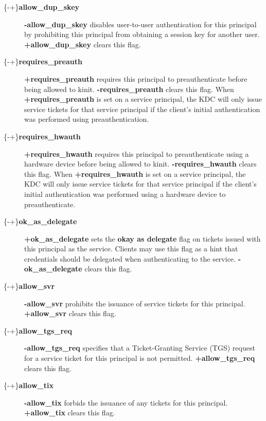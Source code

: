 \documentclass[letterpaper,10pt,english]{sphinxmanual}
\begin{document}
\begin{description}
\item[{\{-\textbar{}+\}\textbf{allow\_dup\_skey}}] \leavevmode
\textbf{-allow\_dup\_skey} disables user-to-user authentication for this
principal by prohibiting this principal from obtaining a session
key for another user.  \textbf{+allow\_dup\_skey} clears this flag.

\item[{\{-\textbar{}+\}\textbf{requires\_preauth}}] \leavevmode
\textbf{+requires\_preauth} requires this principal to preauthenticate
before being allowed to kinit.  \textbf{-requires\_preauth} clears this
flag.  When \textbf{+requires\_preauth} is set on a service principal,
the KDC will only issue service tickets for that service principal
if the client's initial authentication was performed using
preauthentication.

\item[{\{-\textbar{}+\}\textbf{requires\_hwauth}}] \leavevmode
\textbf{+requires\_hwauth} requires this principal to preauthenticate
using a hardware device before being allowed to kinit.
\textbf{-requires\_hwauth} clears this flag.  When \textbf{+requires\_hwauth} is
set on a service principal, the KDC will only issue service tickets
for that service principal if the client's initial authentication was
performed using a hardware device to preauthenticate.

\item[{\{-\textbar{}+\}\textbf{ok\_as\_delegate}}] \leavevmode
\textbf{+ok\_as\_delegate} sets the \textbf{okay as delegate} flag on tickets
issued with this principal as the service.  Clients may use this
flag as a hint that credentials should be delegated when
authenticating to the service.  \textbf{-ok\_as\_delegate} clears this
flag.

\item[{\{-\textbar{}+\}\textbf{allow\_svr}}] \leavevmode
\textbf{-allow\_svr} prohibits the issuance of service tickets for this
principal.  \textbf{+allow\_svr} clears this flag.

\item[{\{-\textbar{}+\}\textbf{allow\_tgs\_req}}] \leavevmode
\textbf{-allow\_tgs\_req} specifies that a Ticket-Granting Service (TGS)
request for a service ticket for this principal is not permitted.
\textbf{+allow\_tgs\_req} clears this flag.

\item[{\{-\textbar{}+\}\textbf{allow\_tix}}] \leavevmode
\textbf{-allow\_tix} forbids the issuance of any tickets for this
principal.  \textbf{+allow\_tix} clears this flag.


\end{description}
\end{document}
